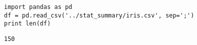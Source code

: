 \documentclass[12pt,fleqn]{article}\usepackage{../common}
\begin{document}
\begin{verbatim}
import pandas as pd
df = pd.read_csv('../stat_summary/iris.csv', sep=';')
print len(df)
\end{verbatim}

\begin{verbatim}
150
\end{verbatim}
\end{document}
